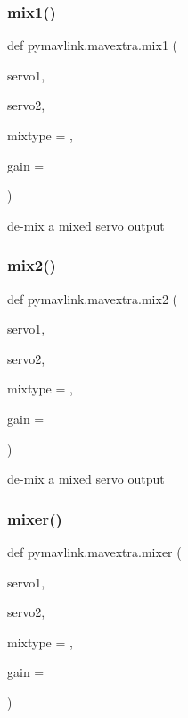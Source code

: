 \subsubsection{\texorpdfstring{mix1()}{mix1()}}
{\footnotesize\ttfamily def pymavlink.\+mavextra.\+mix1 (\begin{DoxyParamCaption}\item[{}]{servo1,  }\item[{}]{servo2,  }\item[{}]{mixtype = {},  }\item[{}]{gain = {} }\end{DoxyParamCaption})}

\begin{DoxyVerb}de-mix a mixed servo output\end{DoxyVerb}
 \mbox{\label{namespacepymavlink_1_1mavextra_a9917a9cc993bdb7a607478dbb089111d}} 
\subsubsection{\texorpdfstring{mix2()}{mix2()}}
{\footnotesize\ttfamily def pymavlink.\+mavextra.\+mix2 (\begin{DoxyParamCaption}\item[{}]{servo1,  }\item[{}]{servo2,  }\item[{}]{mixtype = {},  }\item[{}]{gain = {} }\end{DoxyParamCaption})}

\begin{DoxyVerb}de-mix a mixed servo output\end{DoxyVerb}
 \mbox{\label{namespacepymavlink_1_1mavextra_ae33f40df072016fd86d881d715a57f91}} 
\subsubsection{\texorpdfstring{mixer()}{mixer()}}
{\footnotesize\ttfamily def pymavlink.\+mavextra.\+mixer (\begin{DoxyParamCaption}\item[{}]{servo1,  }\item[{}]{servo2,  }\item[{}]{mixtype = {},  }\item[{}]{gain = {} }\end{DoxyParamCaption})}

